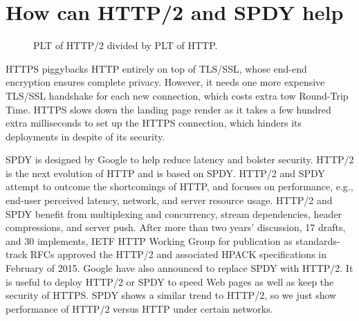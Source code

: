 \section{How can HTTP/2 and SPDY help}

\begin{figure}[htbp]
\centering
{}
\caption{PLT of HTTP/2 divided by PLT of HTTP.}
\label{fig:http2_vs_http}
\end{figure}

HTTPS piggybacks HTTP entirely on top of TLS/SSL, whose end-end encryption ensures complete privacy. However, it needs one more expensive TLS/SSL handshake for each new connection, which costs extra tow Round-Trip Time. HTTPS slows down the landing page render as it takes a few hundred extra milliseconds to set up the HTTPS connection, which hinders its deployments in despite of its security.

SPDY is designed by Google to help reduce latency and bolster security. HTTP/2 is the next evolution of HTTP and is based on SPDY. HTTP/2 and SPDY attempt to outcome the shortcomings of HTTP, and focuses on performance, e.g., end-user perceived latency, network, and server resource usage. HTTP/2 and SPDY benefit from multiplexing and concurrency, stream dependencies, header compressions, and server push. After more than two years' discussion, 17 drafts, and 30 implements, IETF HTTP Working Group for publication as standards-track RFCs approved the HTTP/2 and associated HPACK specifications in February of 2015. Google have also announced to replace SPDY with HTTP/2. It is useful to deploy HTTP/2 or SPDY to speed Web pages as well as keep the security of HTTPS. SPDY shows a similar trend to HTTP/2, so we just show performance  of HTTP/2 versus HTTP under certain networks.

